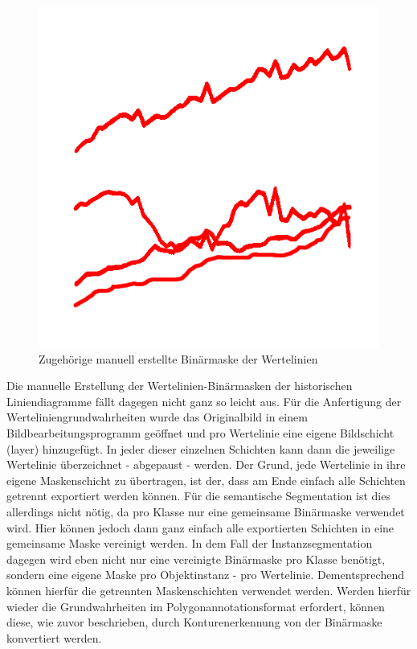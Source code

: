 \begin{figure}[h!]
\begin{minipage}{0.475\textwidth}
        \includegraphics[width=\linewidth]{Methodik/img/lines_historical_mask.png}
        \caption{ Zugehörige manuell erstellte Binärmaske der Wertelinien}
        \label{fig:lines_historical_mask}
    \end{minipage}
\end{figure}

Die manuelle Erstellung der Wertelinien-Binärmasken der historischen Liniendiagramme fällt dagegen nicht ganz so leicht aus. Für die Anfertigung der Werteliniengrundwahrheiten wurde das Originalbild in einem Bildbearbeitungsprogramm \cite{photopea} geöffnet und pro Wertelinie eine eigene Bildschicht (layer) hinzugefügt. In jeder dieser einzelnen Schichten kann dann die jeweilige Wertelinie überzeichnet - abgepaust - werden. Der Grund, jede Wertelinie in ihre eigene Maskenschicht zu übertragen, ist der, dass am Ende einfach alle Schichten getrennt exportiert werden können. Für die semantische Segmentation ist dies allerdings nicht nötig, da pro Klasse nur eine gemeinsame Binärmaske verwendet wird. Hier können jedoch dann ganz einfach alle exportierten Schichten in eine gemeinsame Maske vereinigt werden. In dem Fall der Instanzsegmentation dagegen wird eben nicht nur eine vereinigte Binärmaske pro Klasse benötigt, sondern eine eigene Maske pro Objektinstanz - pro Wertelinie. Dementsprechend können hierfür die getrennten Maskenschichten verwendet werden. Werden hierfür wieder die Grundwahrheiten im Polygonannotationsformat erfordert, können diese, wie zuvor beschrieben, durch Konturenerkennung von der Binärmaske konvertiert werden.
